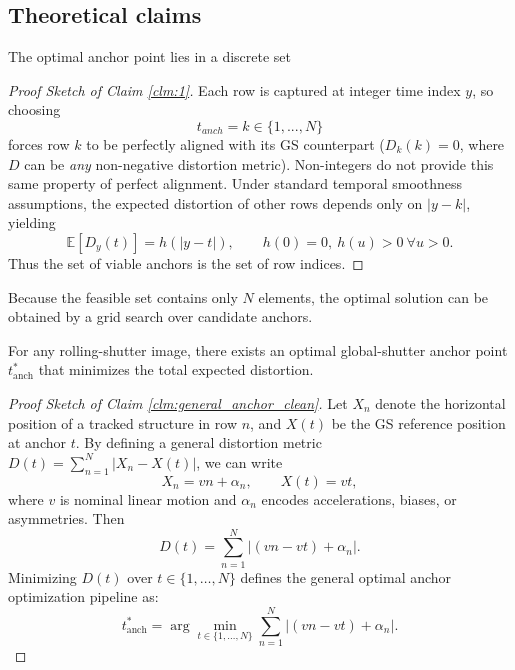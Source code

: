 \subsection{Theoretical claims}

\begin{claim}
        \label{clm:1}
        The optimal anchor point lies in a discrete set
    \end{claim}
    \begin{proof}[Proof Sketch of Claim \ref{clm:1}]
        Each row is captured at integer time index $y$, so choosing 
\begin{equation}
    t_{anch} = k \in {\{1, ..., N\}}
\end{equation}
forces row $k$ to be perfectly aligned with its GS counterpart ($D_k(k) = 0$, where $D$ can be \textit{any} non-negative distortion metric). Non-integers do not provide this same property of perfect alignment. Under standard temporal smoothness assumptions, the expected distortion of other rows depends only on $|y-k|$, yielding
\begin{equation}
    \mathbb{E}[D_y(t)] = h(|y-t|),\qquad h(0)=0,\ h(u)>0\ \forall u>0.
\end{equation}
Thus the set of viable anchors is the set of row indices.
\end{proof}%
\vspace{-3mm}


\begin{corollary}
Because the feasible set contains only $N$ elements, the optimal solution can be obtained by a grid search over candidate anchors.
\end{corollary}



\begin{claim}
\label{clm:general_anchor_clean}
For any rolling-shutter image, there exists an optimal global-shutter anchor point $t_{\text{anch}}^*$ that minimizes the total expected distortion.
\end{claim}

\begin{proof}[Proof Sketch of Claim \ref{clm:general_anchor_clean}]
Let $X_n$ denote the horizontal position of a tracked structure in row $n$, and $X(t)$ be the GS reference position at anchor $t$. By defining a general distortion metric $D(t) = \sum_{n=1}^{N} | X_n - X(t) |$, we can write
\begin{equation}
   X_n = v n + \alpha_n, \qquad X(t) = v t,
\end{equation}
where $v$ is nominal linear motion and $\alpha_n$ encodes accelerations, biases, or asymmetries. Then
\begin{equation}
   D(t) = \sum_{n=1}^{N} | (v n - v t) + \alpha_n |.
\end{equation}
Minimizing $D(t)$ over $t \in \{1, \dots, N\}$ defines the general optimal anchor optimization pipeline as:
\begin{equation}
   t_{\text{anch}}^* = \arg\min_{t \in \{1, \dots, N\}} \sum_{n=1}^{N} | (v n - v t) + \alpha_n |.
\end{equation}
\end{proof}%
\vspace{-3mm}


